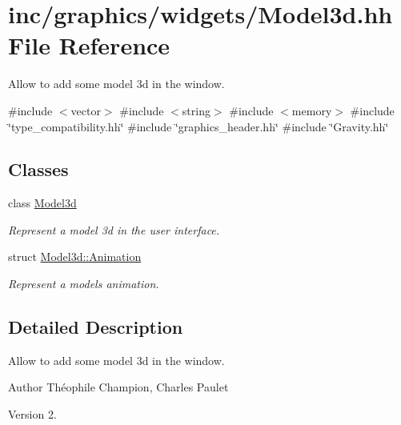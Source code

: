 \hypertarget{Model3d_8hh}{}\section{inc/graphics/widgets/\+Model3d.hh File Reference}
\label{Model3d_8hh}


Allow to add some model 3d in the window.  


{\ttfamily \#include $<$vector$>$}\newline
{\ttfamily \#include $<$string$>$}\newline
{\ttfamily \#include $<$memory$>$}\newline
{\ttfamily \#include \char`\"{}type\+\_\+compatibility.\+hh\char`\"{}}\newline
{\ttfamily \#include \char`\"{}graphics\+\_\+header.\+hh\char`\"{}}\newline
{\ttfamily \#include \char`\"{}Gravity.\+hh\char`\"{}}\newline
\subsection*{Classes}
\begin{DoxyCompactItemize}
\item 
class \hyperlink{classModel3d}{Model3d}
\begin{DoxyCompactList}\small\item\em Represent a model 3d in the user interface. \end{DoxyCompactList}\item 
struct \hyperlink{structModel3d_1_1Animation}{Model3d\+::\+Animation}
\begin{DoxyCompactList}\small\item\em Represent a model\textquotesingle{}s animation. \end{DoxyCompactList}\end{DoxyCompactItemize}


\subsection{Detailed Description}
Allow to add some model 3d in the window. 

\begin{DoxyAuthor}{Author}
Théophile Champion, Charles Paulet 
\end{DoxyAuthor}
\begin{DoxyVersion}{Version}
2. 
\end{DoxyVersion}
